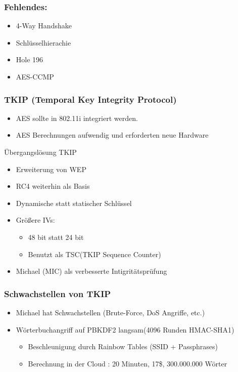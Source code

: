 \documentclass{beamer}
\begin{document}
\begin{frame}
\frametitle{Fehlendes:}
\begin{itemize}
	\item 4-Way Handshake
	\item Schlüsselhierachie
	\item Hole 196
	\item AES-CCMP
\end{itemize}
\end{frame}

\begin{frame}
\frametitle{TKIP (Temporal Key Integrity Protocol)}
\begin{itemize}
	\item AES sollte in 802.11i integriert werden.
	\item AES Berechnungen aufwendig und erforderten neue Hardware
\end{itemize}
\begin{block}{Übergangslösung TKIP}
	\begin{itemize}
		\item Erweiterung von WEP
		\item RC4 weiterhin als Basis
		\item Dynamische statt statischer Schlüssel
		\item Größere IVs:
		\begin{itemize}
			\item 48 bit statt 24 bit
			\item Benutzt als TSC(TKIP Sequence Counter)
		\end{itemize}
		\item Michael (MIC) als verbesserte Intigritätsprüfung
	\end{itemize}
\end{block}
\end{frame}

\begin{frame}
\frametitle{Schwachstellen von TKIP}
\begin{itemize}
	\item Michael hat Schwachstellen (Brute-Force, DoS Angriffe, etc.)
	\item Wörterbuchangriff auf PBKDF2 langsam(4096 Runden HMAC-SHA1)
	\begin{itemize}
		\item Beschleunigung durch Rainbow Tables \cite{renderlab} (SSID + Passphrases)
		\item Berechnung in der Cloud \cite{cloudcracker}: 20 Minuten, 17\$, 300.000.000 Wörter
	\end{itemize}
\end{itemize}
\end{frame}
\end{document}
